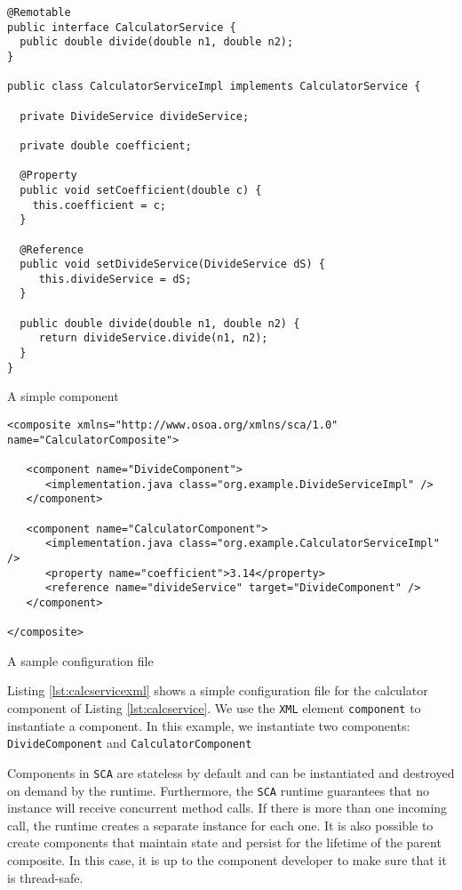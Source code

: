 \begin{listing}[!htbp]
\begin{verbatim}
@Remotable
public interface CalculatorService {
  public double divide(double n1, double n2);
}

public class CalculatorServiceImpl implements CalculatorService {

  private DivideService divideService;
  
  private double coefficient;
  
  @Property
  public void setCoefficient(double c) {
    this.coefficient = c;
  }

  @Reference
  public void setDivideService(DivideService dS) {
     this.divideService = dS;
  }

  public double divide(double n1, double n2) {
     return divideService.divide(n1, n2);
  }
}
\end{verbatim}
\caption{A simple component}
\label{lst:calcservice}
\end{listing}
\begin{listing}[!htbp]
\begin{verbatim}
<composite xmlns="http://www.osoa.org/xmlns/sca/1.0" name="CalculatorComposite">

   <component name="DivideComponent">
      <implementation.java class="org.example.DivideServiceImpl" />
   </component>

   <component name="CalculatorComponent">
      <implementation.java class="org.example.CalculatorServiceImpl" />
      <property name="coefficient">3.14</property>
      <reference name="divideService" target="DivideComponent" />
   </component>

</composite>
\end{verbatim}
\caption{A sample configuration file}
\label{lst:calcservicexml}
\end{listing}

Listing \ref{lst:calcservicexml} shows a simple configuration file for the calculator component of Listing \ref{lst:calcservice}.
We use the \texttt{XML} element \texttt{component} to instantiate a component. In this example, we instantiate two components:
\texttt{DivideComponent} and \texttt{CalculatorComponent}

Components in \texttt{SCA} are stateless by default and can be instantiated and destroyed on demand by the runtime. Furthermore, the
\texttt{SCA} runtime guarantees that no instance will receive concurrent method calls. If there is more than one incoming call, the
runtime creates a separate instance for each one. It is also possible to create components that maintain state and persist
for the lifetime of the parent composite. In this case, it is up to the component developer to make sure that it is thread-safe.

